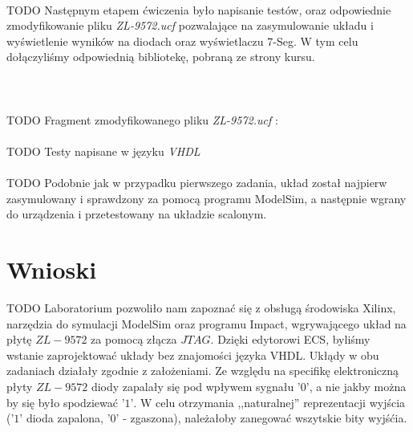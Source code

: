 \documentclass[wide,a4paper,titlepage,12pt] {article}
\begin{document}
  \paragraph{}
  TODO
  Następnym etapem ćwiczenia było napisanie testów, oraz odpowiednie zmodyfikowanie pliku \textit{ZL-9572.ucf} pozwalające na zasymulowanie układu i wyświetlenie wyników na diodach oraz wyświetlaczu 7-Seg. W tym celu dołączyliśmy odpowiednią bibliotekę, pobraną ze strony kursu.
	\\ \\ \\
	\paragraph{}
	TODO
	Fragment zmodyfikowanego pliku \textit{ZL-9572.ucf} :
	

	\paragraph{}
	TODO
	Testy napisane w języku \textit{VHDL}
	

	\paragraph{}
	TODO
	Podobnie jak w przypadku pierwszego zadania, układ został najpierw zasymulowany i sprawdzony za pomocą programu ModelSim, a następnie wgrany do urządzenia i przetestowany na układzie scalonym.


  \paragraph{}
  \newpage
  \section{Wnioski}
  TODO
  Laboratorium pozwoliło nam zapoznać się z obsługą środowiska Xilinx, narzędzia do symulacji ModelSim oraz programu Impact, wgrywającego układ na płytę $ZL-9572$ za pomocą złącza $JTAG$. Dzięki edytorowi ECS, byliśmy wstanie zaprojektować układy bez znajomości języka VHDL. Ukłądy w obu zadaniach działały zgodnie z założeniami. Ze względu na specifikę elektroniczną płyty $ZL-9572$ diody zapalały się pod wpływem sygnału $\mbox{'}0\mbox{'}$, a nie jakby można by się było spodziewać $\mbox{'}1\mbox{'}$. W celu otrzymania ,,naturalnej'' reprezentacji wyjścia ($\mbox{'}1\mbox{'}$ dioda zapalona, $\mbox{'}0\mbox{'}$ - zgaszona), należałoby zanegować wszytskie bity wyjśćia.
\end{document}
